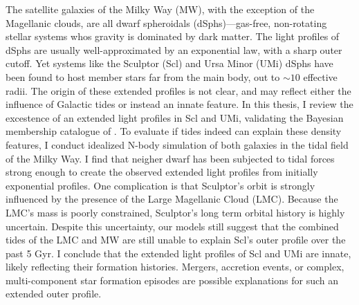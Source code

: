 The satellite galaxies of the Milky Way (MW), with the exception of the
Magellanic clouds, are all dwarf spheroidals (dSphs)---gas-free,
non-rotating stellar systems whos gravity is dominated by dark matter.
The light profiles of dSphs are usually well-approximated by an
exponential law, with a sharp outer cutoff. Yet systems like the
Sculptor (Scl) and Ursa Minor (UMi) dSphs have been found to host member
stars far from the main body, out to \(\sim10\) effective radii. The
origin of these extended profiles is not clear, and may reflect either
the influence of Galactic tides or instead an innate feature. In this
thesis, I review the excestence of an extended light profiles in Scl and
UMi, validating the Bayesian membership catalogue of
\citet{jensen+2024}. To evaluate if tides indeed can explain these
density features, I conduct idealized N-body simulation of both galaxies
in the tidal field of the Milky Way. I find that neigher dwarf has been
subjected to tidal forces strong enough to create the observed extended
light profiles from initially exponential profiles. One complication is
that Sculptor's orbit is strongly influenced by the presence of the
Large Magellanic Cloud (LMC). Because the LMC's mass is poorly
constrained, Sculptor's long term orbital history is highly uncertain.
Despite this uncertainty, our models still suggest that the combined
tides of the LMC and MW are still unable to explain Scl's outer profile
over the past 5 Gyr. I conclude that the extended light profiles of Scl
and UMi are innate, likely reflecting their formation histories.
Mergers, accretion events, or complex, multi-component star formation
episodes are possible explanations for such an extended outer profile.
